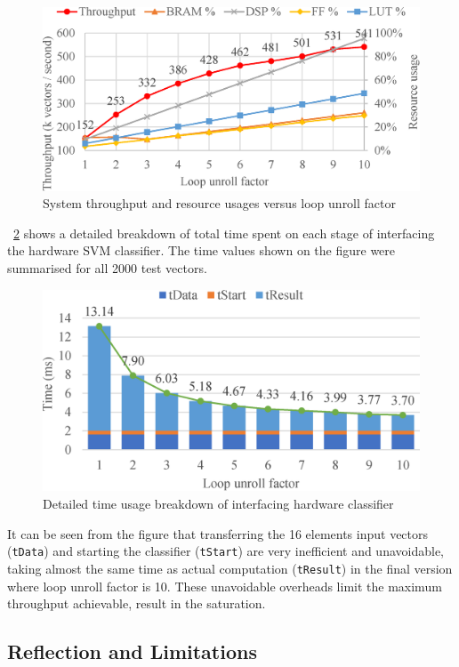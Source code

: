 \documentclass[journal]{IEEEtran}
\newcommand{\fref}[1]{\figurename~\ref{#1}}
\begin{document}
\begin{figure}[t]
	\centering
	\includegraphics[width=0.8\columnwidth]{throughput}
	\caption{System throughput and resource usages versus loop unroll factor}
	\label{fig:throughput}
\end{figure}

\fref{fig:time} shows a detailed breakdown of total time spent on each stage of interfacing the hardware SVM classifier. The time values shown on the figure were summarised for all 2000 test vectors.

\begin{figure}[t]
	\centering
	\includegraphics[width=0.8\columnwidth]{time}
	\caption{Detailed time usage breakdown of interfacing hardware classifier}
	\label{fig:time}
\end{figure}

It can be seen from the figure that transferring the 16 elements input vectors (\texttt{tData}) and starting the classifier (\texttt{tStart}) are very inefficient and unavoidable, taking almost the same time as actual computation (\texttt{tResult}) in the final version where loop unroll factor is 10. These unavoidable overheads limit the maximum throughput achievable, result in the saturation.

\subsection{Reflection and Limitations}
\end{document}
